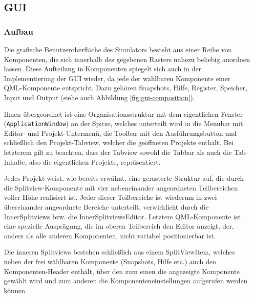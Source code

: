 \subsection{GUI}

\subsubsection{Aufbau}

Die grafische Benutzeroberfläche des Simulators besteht aus einer Reihe von
Komponenten, die sich innerhalb des gegebenen Rasters nahezu beliebig anordnen
lassen. Diese Aufteilung in Komponenten spiegelt sich auch in der
Implementierung der GUI wieder, da jede der wählbaren Komponente einer
QML-Komponente entspricht. Dazu gehören Snapshots, Hilfe, Register, Speicher,
Input und Output (siehe auch Abbildung \ref{fig:gui-composition}).

Ihnen übergeordnet ist eine Organisationsstruktur mit dem eigentlichen Fenster
(\texttt{ApplicationWindow}) an der Spitze, welches unterteilt wird in die
Menubar mit Editor- und Projekt-Untermenü, die Toolbar mit den Ausführungsbutton
und schließlich den Projekt-Tabview, welcher die geöffneten Projekte enthält.
Bei letzterem gilt zu beachten, dass der Tabview sowohl die Tabbar als auch die
Tab-Inhalte, also die eigentlichen Projekte, repräsentiert.

Jedes Projekt weist, wie bereits erwähnt, eine gerasterte Struktur auf, die
durch die Splitview-Komponente mit vier nebeneinander angeordneten Teilbereichen
voller Höhe realisiert ist. Jeder dieser Teilbereiche ist wiederum in zwei
übereinander angeordnete Bereiche unterteilt, verwirklicht durch die
InnerSplitviews bzw. die InnerSplitviewsEditor. Letztere QML-Komponente ist eine
spezielle Ausprägung, die im oberen Teilbereich den Editor anzeigt, der,
anders als alle anderen Komponenten, nicht variabel positionierbar ist.

Die inneren Splitviews bestehen schließlich aus einem SplitViewItem, welches
neben der frei wählbaren Komponente (Snapshots, Hilfe etc.) auch den
Komponenten-Header enthält, über den zum einen die angezeigte Komponente gewählt
wird und zum anderen die Komponenteneinstellungen aufgerufen werden können.

